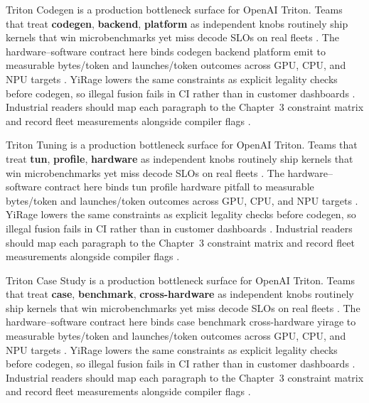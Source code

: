 Triton Codegen is a production bottleneck surface for OpenAI Triton. Teams that treat \textbf{codegen}, \textbf{backend}, \textbf{platform} as independent knobs routinely ship kernels that win microbenchmarks yet miss decode SLOs on real fleets \citep{dlbook,nvidia2024cudagraphs}. The hardware--software contract here binds codegen backend platform emit to measurable bytes/token and launches/token outcomes across GPU, CPU, and NPU targets \citep{dao2022flashattention,liu2024deepseekv3}. YiRage lowers the same constraints as explicit legality checks before codegen, so illegal fusion fails in CI rather than in customer dashboards \citep{kwon2023vllm,patel2025llminference}. Industrial readers should map each paragraph to the Chapter~3 constraint matrix and record fleet measurements alongside compiler flags \citep{nvidia2024cudagraphs,taxbreak2026}.

Triton Tuning is a production bottleneck surface for OpenAI Triton. Teams that treat \textbf{tun}, \textbf{profile}, \textbf{hardware} as independent knobs routinely ship kernels that win microbenchmarks yet miss decode SLOs on real fleets \citep{dao2022flashattention,liu2024deepseekv3}. The hardware--software contract here binds tun profile hardware pitfall to measurable bytes/token and launches/token outcomes across GPU, CPU, and NPU targets \citep{kwon2023vllm,patel2025llminference}. YiRage lowers the same constraints as explicit legality checks before codegen, so illegal fusion fails in CI rather than in customer dashboards \citep{nvidia2024cudagraphs,taxbreak2026}. Industrial readers should map each paragraph to the Chapter~3 constraint matrix and record fleet measurements alongside compiler flags \citep{liu2024deepseekv3,memoryfloor2026}.

Triton Case Study is a production bottleneck surface for OpenAI Triton. Teams that treat \textbf{case}, \textbf{benchmark}, \textbf{cross-hardware} as independent knobs routinely ship kernels that win microbenchmarks yet miss decode SLOs on real fleets \citep{kwon2023vllm,patel2025llminference}. The hardware--software contract here binds case benchmark cross-hardware yirage to measurable bytes/token and launches/token outcomes across GPU, CPU, and NPU targets \citep{nvidia2024cudagraphs,taxbreak2026}. YiRage lowers the same constraints as explicit legality checks before codegen, so illegal fusion fails in CI rather than in customer dashboards \citep{liu2024deepseekv3,memoryfloor2026}. Industrial readers should map each paragraph to the Chapter~3 constraint matrix and record fleet measurements alongside compiler flags \citep{patel2025llminference,nvidia2022hopper}.

